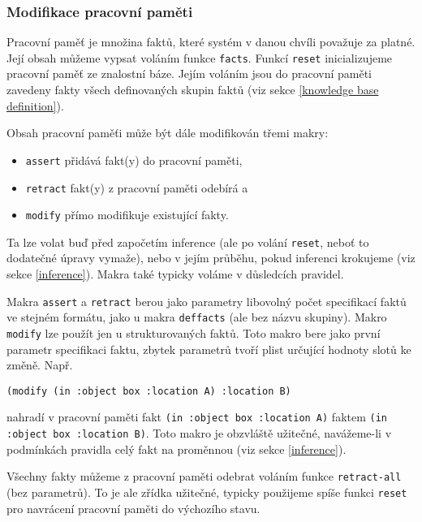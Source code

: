 \subsubsection{Modifikace pracovní paměti}
\label{modifikace}

Pracovní paměť je množina faktů, které systém v danou chvíli považuje za platné.
Její obsah můžeme vypsat voláním funkce \verb|facts|. Funkcí \verb|reset|
inicializujeme pracovní paměť ze znalostní báze. Jejím voláním jsou do pracovní
paměti zavedeny fakty všech definovaných skupin faktů (viz sekce
\ref{knowledge base definition}).

Obsah pracovní paměťi může být dále modifikován třemi makry:
\begin{itemize}
  \item \verb|assert| přidává fakt(y) do pracovní paměti,
  \item \verb|retract| fakt(y) z pracovní paměti odebírá a
  \item \verb|modify| přímo modifikuje existující fakty.
\end{itemize}
Ta lze volat buď před započetím inference (ale po volání \verb|reset|, neboť to
dodatečné úpravy vymaže), nebo v jejím průběhu, pokud inferenci krokujeme (viz
sekce \ref{inference}). Makra také typicky voláme v důsledcích pravidel.

Makra \verb|assert| a \verb|retract| berou jako parametry libovolný počet
specifikací faktů ve stejném formátu, jako u makra \verb|deffacts| (ale bez
názvu skupiny). Makro \verb|modify| lze použít jen u strukturovaných faktů. Toto
makro bere jako první parametr specifikaci faktu, zbytek parametrů tvoří plist
určující hodnoty slotů ke změně. Např.
\begin{verbatim}
(modify (in :object box :location A) :location B)
\end{verbatim}
nahradí v pracovní paměti fakt \verb|(in :object box :location A)| faktem
\verb|(in :object box :location B)|.
Toto makro je obzvláště užitečné, navážeme-li v podmínkách pravidla celý fakt na
proměnnou (viz sekce \ref{inference}).

Všechny fakty můžeme z pracovní paměti odebrat voláním funkce \verb|retract-all|
(bez parametrů). To je ale zřídka užitečné, typicky použijeme spíše funkci
\verb|reset| pro navrácení pracovní paměti do výchozího stavu.
